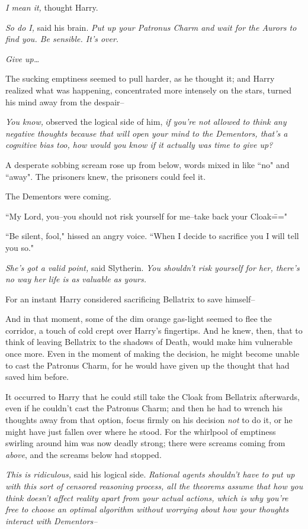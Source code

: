 \emph{I mean it,} thought Harry.

\emph{So do I,} said his brain. \emph{Put up your Patronus Charm and wait for the Aurors to find you. Be sensible. It's over.}

\emph{Give up{\ldots}}

The sucking emptiness seemed to pull harder, as he thought it; and Harry realized what was happening, concentrated more intensely on the stars, turned his mind away from the despair\---

\emph{You know,} observed the logical side of him, \emph{if you're not allowed to think \emph{any} negative thoughts because that will open your mind to the Dementors, \emph{that's} a cognitive bias too, how would you know if it actually \emph{was} time to give up?}

A desperate sobbing scream rose up from below, words mixed in like ``no" and ``away". The prisoners knew, the prisoners could feel it.

The Dementors were coming.

``My Lord, you\---you should not risk yourself for me\---take back your Cloak\==="

``Be silent, fool," hissed an angry voice. ``When I decide to sacrifice you I will tell you so."

\emph{She's got a valid point,} said Slytherin. \emph{You \emph{shouldn't} risk yourself for her, there's no way her life is as valuable as yours.}

For an instant Harry considered sacrificing Bellatrix to save himself\---

And in that moment, some of the dim orange gas-light seemed to flee the corridor, a touch of cold crept over Harry's fingertips. And he knew, then, that to think of leaving Bellatrix to the shadows of Death, would make him vulnerable once more. Even in the moment of making the decision, he might become unable to cast the Patronus Charm, for he would have given up the thought that had saved him before.

It occurred to Harry that he could still take the Cloak from Bellatrix afterwards, even if he couldn't cast the Patronus Charm; and then he had to wrench his thoughts away from that option, focus firmly on his decision \emph{not} to do it, or he might have just fallen over where he stood. For the whirlpool of emptiness swirling around him was now deadly strong; there were screams coming from \emph{above}, and the screams below had stopped.

\emph{This is ridiculous,} said his logical side. \emph{Rational agents shouldn't have to put up with this sort of censored reasoning process, all the theorems assume that how you think doesn't affect reality apart from your actual actions, which is why you're free to choose an optimal algorithm without worrying about how your thoughts interact with Dementors\---}

